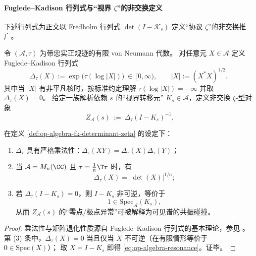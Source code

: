 \paragraph{Fuglede--Kadison 行列式与“视界 \texorpdfstring{$\zeta$}{zeta}”的非交换定义}
下述行列式为正文以 Fredholm 行列式 \(\det(I-\mathcal{K}_s)\) 定义“协议 \(\zeta\)”的非交换推广。

\begin{definition}\label{def:op-algebra-fk-determinant-zeta}
令 \((\mathcal{A},\tau)\) 为带忠实正规迹的有限 von Neumann 代数。
对任意元 \(X\in\mathcal{A}\) 定义 Fuglede--Kadison 行列式
\begin{equation}\label{eq:op-algebra-fkdet}
\boxed{\;\Delta_\tau(X):=\exp\bigl(\tau(\log|X|)\bigr)\ \in\ [0,\infty),\qquad |X|:=(X^\ast X)^{1/2}.\;}
\end{equation}
其中当 \(|X|\) 有非平凡核时，按标准约定理解 \(\tau(\log|X|)=-\infty\) 并取 \(\Delta_\tau(X)=0\)。
给定一族解析依赖 \(s\) 的“视界转移元” \(K_s\in\mathcal{A}\)，定义非交换 \(\zeta\)-型对象
\begin{equation}\label{eq:op-algebra-nc-zeta}
\boxed{\;
Z_{\mathcal{A}}(s)\ :=\ \Delta_\tau(I-K_s)^{-1}.
}
\end{equation}
\end{definition}

\begin{proposition}\label{prop:op-algebra-fkdet-properties}
在定义 \ref{def:op-algebra-fk-determinant-zeta} 的设定下：
\begin{enumerate}
  \item \(\Delta_\tau\) 具有严格乘法性：\(\Delta_\tau(XY)=\Delta_\tau(X)\Delta_\tau(Y)\)；
  \item 当 \(\mathcal{A}=M_n(\CC)\) 且 \(\tau=\frac{1}{n}\Tr\) 时，有
  \[
  \Delta_\tau(X)=|\det(X)|^{1/n};
  \]
  \item 若 \(\Delta_\tau(I-K_s)=0\)，则 \(I-K_s\) 非可逆，等价于
  \begin{equation}\label{eq:op-algebra-resonance}
  \boxed{\;1\in\mathrm{Spec}_{\mathcal{A}}(K_s),\;}
  \end{equation}
  从而 \(Z_{\mathcal{A}}(s)\) 的“零点/极点异常”可被解释为可见谱的共振碰撞。
\end{enumerate}
\end{proposition}

\begin{proof}
乘法性与矩阵退化性质源自 Fuglede--Kadison 行列式的基本理论，参见 \cite{FugledeKadison1951DeterminantsTraceFiniteFactors}。
第 (3) 条中，\(\Delta_\tau(X)=0\) 当且仅当 \(X\) 不可逆（在有限情形等价于 \(0\in\mathrm{Spec}(X)\)）；
取 \(X=I-K_s\) 即得 \eqref{eq:op-algebra-resonance}。证毕。
\end{proof}

